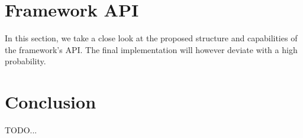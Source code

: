 \documentclass[a4paper,twoside]{article}
\begin{document}
\section{Framework API}

In this section, we take a close look at the proposed structure and capabilities of the framework's API.
The final implementation will however deviate with a high probability.

\section{Conclusion}

TODO...

\newpage

\listoffigures

\end{document}
